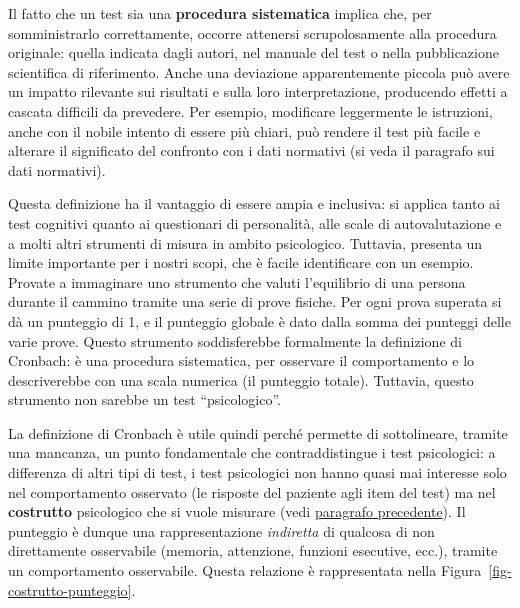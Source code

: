 \documentclass[
  italian,
  letterpaper,
  paper=6in:9in,
  pagesize=pdftex,
  headinclude=on,
  footinclude=on,
  11pt]{scrbook}
\begin{document}
\begin{tcolorbox}[enhanced jigsaw, title=\textcolor{quarto-callout-important-color}{\faExclamation}\hspace{0.5em}{Nota}, coltitle=black, bottomtitle=1mm, colback=white, bottomrule=.15mm, rightrule=.15mm, breakable, toptitle=1mm, left=2mm, colbacktitle=quarto-callout-important-color!10!white, titlerule=0mm, colframe=quarto-callout-important-color-frame, leftrule=.75mm, opacitybacktitle=0.6, arc=.35mm, toprule=.15mm, opacityback=0]

Il fatto che un test sia una \textbf{procedura sistematica} implica che,
per somministrarlo correttamente, occorre attenersi scrupolosamente alla
procedura originale: quella indicata dagli autori, nel manuale del test
o nella pubblicazione scientifica di riferimento. Anche una deviazione
apparentemente piccola può avere un impatto rilevante sui risultati e
sulla loro interpretazione, producendo effetti a cascata difficili da
prevedere. Per esempio, modificare leggermente le istruzioni, anche con
il nobile intento di essere più chiari, può rendere il test più facile e
alterare il significato del confronto con i dati normativi (si veda il
paragrafo sui dati normativi).

\end{tcolorbox}

Questa definizione ha il vantaggio di essere ampia e inclusiva: si
applica tanto ai test cognitivi quanto ai questionari di personalità,
alle scale di autovalutazione e a molti altri strumenti di misura in
ambito psicologico. Tuttavia, presenta un limite importante per i nostri
scopi, che è facile identificare con un esempio. Provate a immaginare
uno strumento che valuti l'equilibrio di una persona durante il cammino
tramite una serie di prove fisiche. Per ogni prova superata si dà un
punteggio di 1, e il punteggio globale è dato dalla somma dei punteggi
delle varie prove. Questo strumento soddisferebbe formalmente la
definizione di Cronbach: è una procedura sistematica, per osservare il
comportamento e lo descriverebbe con una scala numerica (il punteggio
totale). Tuttavia, questo strumento non sarebbe un test ``psicologico''.

La definizione di Cronbach è utile quindi perché permette di
sottolineare, tramite una mancanza, un punto fondamentale che
contraddistingue i test psicologici: a differenza di altri tipi di test,
i test psicologici non hanno quasi mai interesse solo nel comportamento
osservato (le risposte del paziente agli item del test) ma nel
\textbf{costrutto} psicologico che si vuole misurare (vedi
\hyperref[cosa-misuriamo-in-neuropsicologia-clinica]{paragrafo
precedente}). Il punteggio è dunque una rappresentazione
\emph{indiretta} di qualcosa di non direttamente osservabile (memoria,
attenzione, funzioni esecutive, ecc.), tramite un comportamento
osservabile. Questa relazione è rappresentata nella
Figura~\ref{fig-costrutto-punteggio}.
\end{document}
